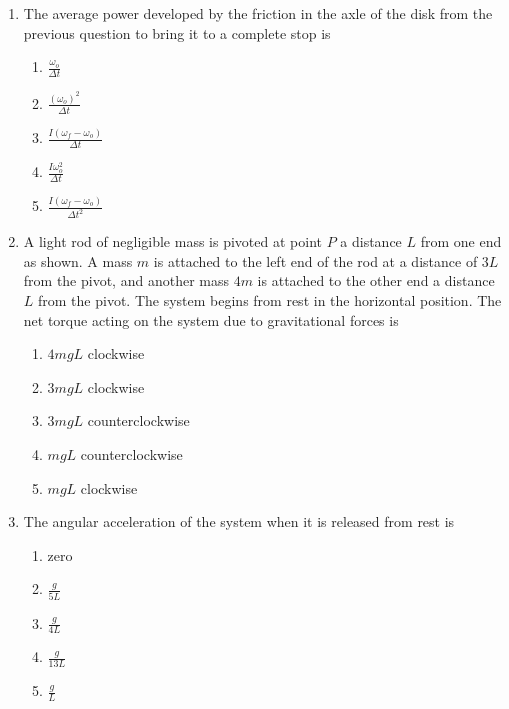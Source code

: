 \documentclass{../../oss-apphys}
\begin{document}
\begin{multicols}{2}
\begin{enumerate}[leftmargin=18pt]
  \item The average power developed by the friction in the axle of the disk
    from the previous question to bring it to a complete stop is
    \begin{enumerate}[noitemsep,topsep=0pt]
    \item $\displaystyle\frac{\omega_o}{\Delta t}$
    \item $\displaystyle\frac{(\omega_o)^2}{\Delta t}$
    \item $\displaystyle\frac{I(\omega_f-\omega_o)}{\Delta t}$
    \item $\displaystyle\frac{I\omega_o^2}{\Delta t}$
    \item $\displaystyle\frac{I(\omega_f-\omega_o)}{\Delta t^2}$
    \end{enumerate}
    
  \item A light rod of negligible mass is pivoted at point $P$ a distance $L$ from
    one end as shown. A mass $m$ is attached to the left end of the rod at a
    distance of $3L$ from the pivot, and another mass $4m$ is attached to the
    other end a distance $L$ from the pivot. The system begins from rest in the
    horizontal position. The net torque acting on the system due to gravitational
    forces is
    \begin{center}
    \end{center}
    \begin{enumerate}[noitemsep,topsep=0pt]
    \item $4mgL$ clockwise
    \item $3mgL$ clockwise
    \item $3mgL$ counterclockwise
    \item $mgL$ counterclockwise
    \item $mgL$ clockwise
    \end{enumerate}

  \item The angular acceleration of the system when it is released from rest is
    \begin{enumerate}[noitemsep,topsep=0pt]
    \item zero
    \item $\displaystyle\frac{g}{5L}$
    \item $\displaystyle\frac{g}{4L}$
    \item $\displaystyle\frac{g}{13L}$
    \item  $\displaystyle\frac{g}{L}$
    \end{enumerate}
  \end{enumerate}

\end{multicols}
\end{document}
